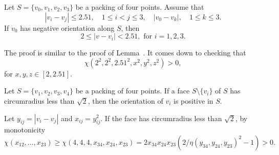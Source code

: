 \begin{tarskidata}
\begin{tarski}

\begin{lemma} Let $S=\{v_0,v_1,v_2,v_3\}$ be a
packing of four points.  Assume that 
  $$
  |v_i-v_j|\le 2.51,\quad 1\le i < j \le 3,
  \quad |v_0-v_k|,\quad 1\le k\le 3.
  $$
 If $v_0$
has negative orientation along
$S$, then
  $$
  2 \le |v-v_i | < 2.51, \text{ for } i=1,2,3.
  $$
\end{lemma}

\begin{proved} The proof is similar to the proof of
Lemma~. It comes down to checking that
    $$
    \chi(2^2,2^2,2.51^2,x^2,y^2,z^2)>0,$$
    for $x,y,z\in[2,2.51]$.
\swallowed\end{proved}
\end{tarski}




\begin{tarski}

\begin{lemma}
%
Let $S=\{v_1,v_2,v_3,v_4\}$ be a packing of four
points.
If a face $S\setminus\{v_i\}$ of $S$ 
has circumradius less than $\sqrt2$, then
the orientation of $v_i$ is positive in $S$.
\end{lemma}

\begin{proved}
Let $y_{ij}=|v_i-v_j|$ and $x_{ij} = y_{ij}^2$.
If the face has circumradius less than $\sqrt2$, by monotonicity
    $$\chi(x_{12},\ldots,x_{23}) \ge \chi(4,4,4,x_{34},x_{24},x_{23})
    = 2 x_{34}x_{24}x_{23}
    (2/\eta(y_{34},y_{24},y_{23})^2 - 1) >0.$$
\swallowed\end{proved}
\end{tarski}





\begin{tarski}


\end{tarski}
\end{tarskidata}
